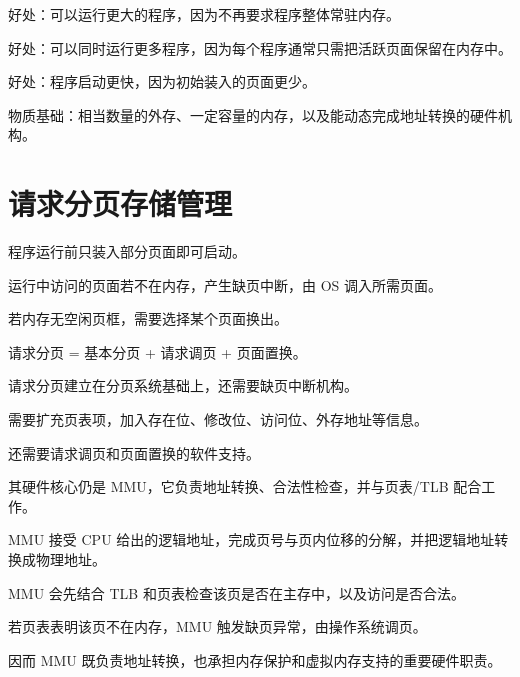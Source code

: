 \begin{points}
  \item 好处：可以运行更大的程序，因为不再要求程序整体常驻内存。
  \item 好处：可以同时运行更多程序，因为每个程序通常只需把活跃页面保留在内存中。
  \item 好处：程序启动更快，因为初始装入的页面更少。
  \item 物质基础：相当数量的外存、一定容量的内存，以及能动态完成地址转换的硬件机构。
\end{points}


\section{请求分页存储管理}
\begin{points}
  \item 程序运行前只装入部分页面即可启动。
  \item 运行中访问的页面若不在内存，产生缺页中断，由 OS 调入所需页面。
  \item 若内存无空闲页框，需要选择某个页面换出。
  \item 请求分页 = 基本分页 + 请求调页 + 页面置换。
\end{points}


\begin{points}
  \item 请求分页建立在分页系统基础上，还需要缺页中断机构。
  \item 需要扩充页表项，加入存在位、修改位、访问位、外存地址等信息。
  \item 还需要请求调页和页面置换的软件支持。
  \item 其硬件核心仍是 MMU，它负责地址转换、合法性检查，并与页表/TLB 配合工作。
\end{points}


\begin{points}
  \item MMU 接受 CPU 给出的逻辑地址，完成页号与页内位移的分解，并把逻辑地址转换成物理地址。
  \item MMU 会先结合 TLB 和页表检查该页是否在主存中，以及访问是否合法。
  \item 若页表表明该页不在内存，MMU 触发缺页异常，由操作系统调页。
  \item 因而 MMU 既负责地址转换，也承担内存保护和虚拟内存支持的重要硬件职责。
\end{points}


